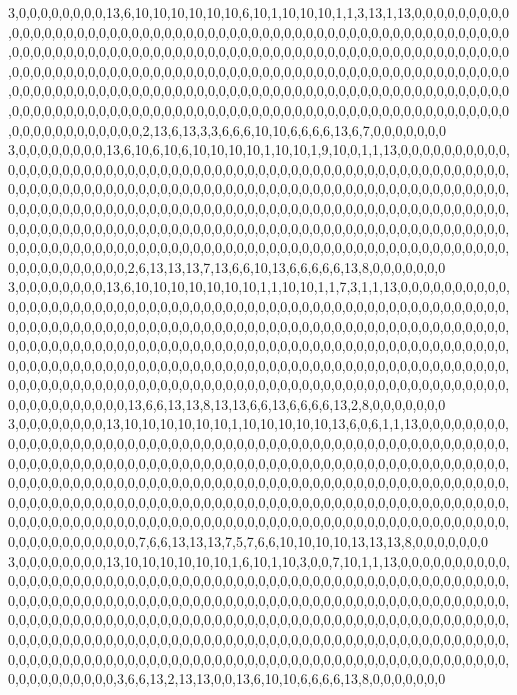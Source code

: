3,0,0,0,0,0,0,0,0,13,6,10,10,10,10,10,10,6,10,1,10,10,10,1,1,3,13,1,13,0,0,0,0,0,0,0,0,0,0,0,0,0,0,0,0,0,0,0,0,0,0,0,0,0,0,0,0,0,0,0,0,0,0,0,0,0,0,0,0,0,0,0,0,0,0,0,0,0,0,0,0,0,0,0,0,0,0,0,0,0,0,0,0,0,0,0,0,0,0,0,0,0,0,0,0,0,0,0,0,0,0,0,0,0,0,0,0,0,0,0,0,0,0,0,0,0,0,0,0,0,0,0,0,0,0,0,0,0,0,0,0,0,0,0,0,0,0,0,0,0,0,0,0,0,0,0,0,0,0,0,0,0,0,0,0,0,0,0,0,0,0,0,0,0,0,0,0,0,0,0,0,0,0,0,0,0,0,0,0,0,0,0,0,0,0,0,0,0,0,0,0,0,0,0,0,0,0,0,0,0,0,0,0,0,0,0,0,0,0,0,0,0,0,0,0,0,0,0,0,0,0,0,0,0,0,0,0,0,0,0,0,0,0,0,0,0,0,0,0,0,0,0,0,0,0,0,0,0,0,0,0,0,0,0,0,0,0,0,0,0,0,0,0,0,0,0,0,0,0,0,2,13,6,13,3,3,6,6,6,10,10,6,6,6,6,13,6,7,0,0,0,0,0,0,0
3,0,0,0,0,0,0,0,0,13,6,10,6,10,6,10,10,10,10,1,10,10,1,9,10,0,1,1,13,0,0,0,0,0,0,0,0,0,0,0,0,0,0,0,0,0,0,0,0,0,0,0,0,0,0,0,0,0,0,0,0,0,0,0,0,0,0,0,0,0,0,0,0,0,0,0,0,0,0,0,0,0,0,0,0,0,0,0,0,0,0,0,0,0,0,0,0,0,0,0,0,0,0,0,0,0,0,0,0,0,0,0,0,0,0,0,0,0,0,0,0,0,0,0,0,0,0,0,0,0,0,0,0,0,0,0,0,0,0,0,0,0,0,0,0,0,0,0,0,0,0,0,0,0,0,0,0,0,0,0,0,0,0,0,0,0,0,0,0,0,0,0,0,0,0,0,0,0,0,0,0,0,0,0,0,0,0,0,0,0,0,0,0,0,0,0,0,0,0,0,0,0,0,0,0,0,0,0,0,0,0,0,0,0,0,0,0,0,0,0,0,0,0,0,0,0,0,0,0,0,0,0,0,0,0,0,0,0,0,0,0,0,0,0,0,0,0,0,0,0,0,0,0,0,0,0,0,0,0,0,0,0,0,0,0,0,0,0,0,0,0,0,0,0,0,0,0,0,0,0,2,6,13,13,13,7,13,6,6,10,13,6,6,6,6,6,13,8,0,0,0,0,0,0,0
3,0,0,0,0,0,0,0,0,13,6,10,10,10,10,10,10,10,1,1,10,10,1,1,7,3,1,1,13,0,0,0,0,0,0,0,0,0,0,0,0,0,0,0,0,0,0,0,0,0,0,0,0,0,0,0,0,0,0,0,0,0,0,0,0,0,0,0,0,0,0,0,0,0,0,0,0,0,0,0,0,0,0,0,0,0,0,0,0,0,0,0,0,0,0,0,0,0,0,0,0,0,0,0,0,0,0,0,0,0,0,0,0,0,0,0,0,0,0,0,0,0,0,0,0,0,0,0,0,0,0,0,0,0,0,0,0,0,0,0,0,0,0,0,0,0,0,0,0,0,0,0,0,0,0,0,0,0,0,0,0,0,0,0,0,0,0,0,0,0,0,0,0,0,0,0,0,0,0,0,0,0,0,0,0,0,0,0,0,0,0,0,0,0,0,0,0,0,0,0,0,0,0,0,0,0,0,0,0,0,0,0,0,0,0,0,0,0,0,0,0,0,0,0,0,0,0,0,0,0,0,0,0,0,0,0,0,0,0,0,0,0,0,0,0,0,0,0,0,0,0,0,0,0,0,0,0,0,0,0,0,0,0,0,0,0,0,0,0,0,0,0,0,0,0,0,0,0,0,0,13,6,6,13,13,8,13,13,6,6,13,6,6,6,6,13,2,8,0,0,0,0,0,0,0
3,0,0,0,0,0,0,0,0,13,10,10,10,10,10,10,1,10,10,10,10,10,13,6,0,6,1,1,13,0,0,0,0,0,0,0,0,0,0,0,0,0,0,0,0,0,0,0,0,0,0,0,0,0,0,0,0,0,0,0,0,0,0,0,0,0,0,0,0,0,0,0,0,0,0,0,0,0,0,0,0,0,0,0,0,0,0,0,0,0,0,0,0,0,0,0,0,0,0,0,0,0,0,0,0,0,0,0,0,0,0,0,0,0,0,0,0,0,0,0,0,0,0,0,0,0,0,0,0,0,0,0,0,0,0,0,0,0,0,0,0,0,0,0,0,0,0,0,0,0,0,0,0,0,0,0,0,0,0,0,0,0,0,0,0,0,0,0,0,0,0,0,0,0,0,0,0,0,0,0,0,0,0,0,0,0,0,0,0,0,0,0,0,0,0,0,0,0,0,0,0,0,0,0,0,0,0,0,0,0,0,0,0,0,0,0,0,0,0,0,0,0,0,0,0,0,0,0,0,0,0,0,0,0,0,0,0,0,0,0,0,0,0,0,0,0,0,0,0,0,0,0,0,0,0,0,0,0,0,0,0,0,0,0,0,0,0,0,0,0,0,0,0,0,0,0,0,0,0,7,6,6,13,13,13,7,5,7,6,6,10,10,10,10,13,13,13,8,0,0,0,0,0,0,0
3,0,0,0,0,0,0,0,0,13,10,10,10,10,10,10,1,6,10,1,10,3,0,0,7,10,1,1,13,0,0,0,0,0,0,0,0,0,0,0,0,0,0,0,0,0,0,0,0,0,0,0,0,0,0,0,0,0,0,0,0,0,0,0,0,0,0,0,0,0,0,0,0,0,0,0,0,0,0,0,0,0,0,0,0,0,0,0,0,0,0,0,0,0,0,0,0,0,0,0,0,0,0,0,0,0,0,0,0,0,0,0,0,0,0,0,0,0,0,0,0,0,0,0,0,0,0,0,0,0,0,0,0,0,0,0,0,0,0,0,0,0,0,0,0,0,0,0,0,0,0,0,0,0,0,0,0,0,0,0,0,0,0,0,0,0,0,0,0,0,0,0,0,0,0,0,0,0,0,0,0,0,0,0,0,0,0,0,0,0,0,0,0,0,0,0,0,0,0,0,0,0,0,0,0,0,0,0,0,0,0,0,0,0,0,0,0,0,0,0,0,0,0,0,0,0,0,0,0,0,0,0,0,0,0,0,0,0,0,0,0,0,0,0,0,0,0,0,0,0,0,0,0,0,0,0,0,0,0,0,0,0,0,0,0,0,0,0,0,0,0,0,0,0,0,0,0,0,0,3,6,6,13,2,13,13,0,0,13,6,10,10,6,6,6,6,13,8,0,0,0,0,0,0,0
